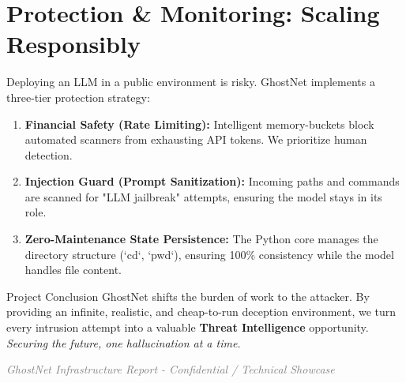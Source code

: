 \documentclass[11pt,a4paper,oneside]{article}
\begin{document}
\vspace{0.6cm}

\section{Protection \& Monitoring: Scaling Responsibly}
Deploying an LLM in a public environment is risky. GhostNet implements a three-tier protection strategy:

\begin{enumerate}
    \item \textbf{Financial Safety (Rate Limiting):} Intelligent memory-buckets block automated scanners from exhausting API tokens. We prioritize human detection.
    \item \textbf{Injection Guard (Prompt Sanitization):} Incoming paths and commands are scanned for "LLM jailbreak" attempts, ensuring the model stays in its role.
    \item \textbf{Zero-Maintenance State Persistence:} The Python core manages the directory structure (`cd`, `pwd`), ensuring 100\% consistency while the model handles file content.
\end{enumerate}

\vspace{1cm}

\begin{cyberbox}{Project Conclusion}
    \noindent GhostNet shifts the burden of work to the attacker. By providing an infinite, realistic, and cheap-to-run deception environment, we turn every intrusion attempt into a valuable \textbf{Threat Intelligence} opportunity.
    \vspace{2mm} \\
    \textit{Securing the future, one hallucination at a time.}
\end{cyberbox}

\begin{center}
    \small \textcolor{gray}{\textit{GhostNet Infrastructure Report - Confidential / Technical Showcase}}
\end{center}
\end{document}
